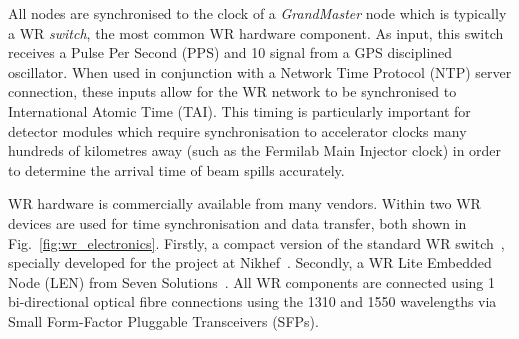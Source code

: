 All nodes are synchronised to the clock of a \emph{GrandMaster} node which is typically a WR
\emph{switch}, the most common WR hardware component. As input, this switch receives a Pulse Per
Second (PPS) and \unit{10}{} signal from a GPS disciplined oscillator. When used in
conjunction with a Network Time Protocol (NTP) server connection, these inputs allow for the WR
network to be synchronised to International Atomic Time (TAI). This timing is particularly
important for \chips detector modules which require synchronisation to accelerator clocks many
hundreds of kilometres away (such as the Fermilab Main Injector clock) in order to determine the
arrival time of beam spills accurately.

WR hardware is commercially available from many vendors. Within \chipsfive two WR devices are used
for time synchronisation and data transfer, both shown in Fig.~\ref{fig:wr_electronics}. Firstly,
a compact version of the standard WR switch~\cite{wrswitch2020}, specially developed for the
\chips project at Nikhef~\cite{wrchromium2020}. Secondly, a WR Lite Embedded Node (LEN) from Seven
Solutions~\cite{wrlen2020}. All WR components are connected using \unit{1}{}
bi-directional optical fibre connections using the \unit{1310}{} and
\unit{1550}{} wavelengths via Small Form-Factor Pluggable Transceivers (SFPs).

